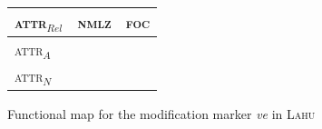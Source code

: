 \begin{figure}
\parbox[b]{\textwidth}{
\begin{center}
\begin{tabular}{| l || c | c |}
\cline{1-1}
\\
\hline
\textsc{attr}$_{Rel}$ & \textsc{nmlz} & \textsc{foc}\\
\hline
\textsc{attr}$_{A}$\\
\cline{1-1}
\textsc{attr}$_{N}$\\
\cline{1-1}
\end{tabular}
\end{center}
}
\caption[Functional map for modification marking]{Functional map for the modification marker \textit{ve} in \textsc{Lahu}}
\label{lahu funcmap}
\end{figure}

